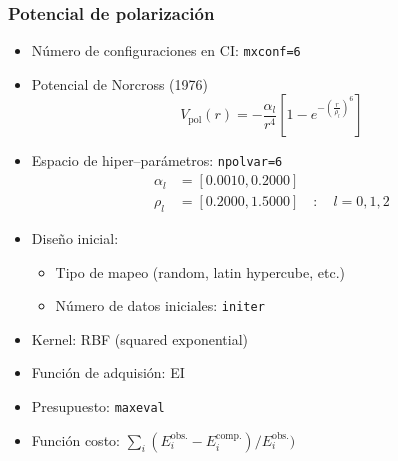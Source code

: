 \documentclass{beamer}
\begin{document}
\begin{frame}[t]
\frametitle{Potencial de polarización}

\begin{itemize}
\item Número de configuraciones en CI: \texttt{mxconf=6}
\item Potencial de Norcross (1976)
\vspace{-0.25cm}
\begin{equation*}
  V_{\textrm{pol}}(r) = -\frac{\alpha_l}{r^4}\left[1-e^{-\left(\tfrac{r}{\rho_l}\right)^6}\right]
\end{equation*}
\vspace{-0.6cm}
\item Espacio de hiper--parámetros: \texttt{npolvar=6}
  \vspace{-0.25cm}
  \begin{align*} 
    \alpha_l &=[0.0010,0.2000] \\
    \rho_l   &=[0.2000,1.5000] \quad:\quad l=0,1,2
  \end{align*}
\vspace{-0.8cm}
\item Diseño inicial:
  \begin{itemize}
    \item Tipo de mapeo (random, latin hypercube, etc.)
    \item Número de datos iniciales: \texttt{initer}
  \end{itemize}
\item Kernel: RBF (squared exponential)
\item Función de adquisión: EI
\item Presupuesto: \texttt{maxeval}
\item Función costo: $\sum_i (E_i^{\textrm{obs.}}-E_i^{\textrm{comp.}})/E_i^{\textrm{obs.}})$
\end{itemize}


\end{frame}
\end{document}

